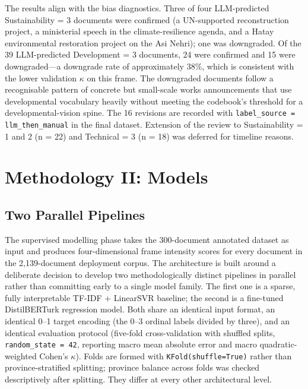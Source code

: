 \documentclass[12pt, journal]{IEEEtran}
\begin{document}
The results align with the bias diagnostics. Three of four LLM-predicted Sustainability = 3 documents were confirmed (a UN-supported reconstruction project, a ministerial speech in the climate-resilience agenda, and a Hatay environmental restoration project on the Asi Nehri); one was downgraded. Of the 39 LLM-predicted Development = 3 documents, 24 were confirmed and 15 were downgraded---a downgrade rate of approximately 38\%, which is consistent with the lower validation $\kappa$ on this frame. The downgraded documents follow a recognisable pattern of concrete but small-scale works announcements that use developmental vocabulary heavily without meeting the codebook's threshold for a developmental-vision spine. The 16 revisions are recorded with \texttt{label\_source = llm\_then\_manual} in the final dataset. Extension of the review to Sustainability = 1 and 2 (n = 22) and Technical = 3 (n = 18) was deferred for timeline reasons.

\section{Methodology II: Models}
\subsection{Two Parallel Pipelines}
The supervised modelling phase takes the 300-document annotated dataset as input and produces four-dimensional frame intensity scores for every document in the 2,139-document deployment corpus. The architecture is built around a deliberate decision to develop two methodologically distinct pipelines in parallel rather than committing early to a single model family. The first one is a sparse, fully interpretable TF-IDF + LinearSVR baseline; the second is a fine-tuned DistilBERTurk regression model. Both share an identical input format, an identical 0--1 target encoding (the 0--3 ordinal labels divided by three), and an identical evaluation protocol (five-fold cross-validation with shuffled splits, \texttt{random\_state = 42}, reporting macro mean absolute error and macro quadratic-weighted Cohen's $\kappa$). Folds are formed with \texttt{KFold(shuffle=True)} rather than province-stratified splitting; province balance across folds was checked descriptively after splitting. They differ at every other architectural level.
\end{document}
